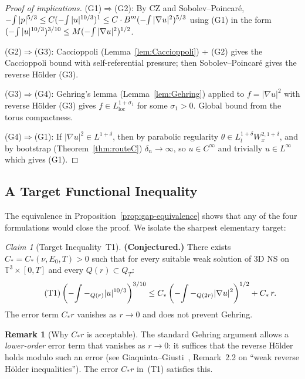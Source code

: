 \documentclass[11pt]{article}
\theoremstyle{definition}
\newtheorem{remark}[theorem]{Remark}
\theoremstyle{remark}
\newtheorem{claim}[theorem]{Claim}
\newcommand{\T}{\mathbb{T}}
\newcommand{\grad}{\nabla}
\newcommand{\Xint}{\mathop{\mathchoice{\vcenter{\hbox{$\displaystyle-$}}}%
  {\vcenter{\hbox{$\textstyle-$}}}%
  {\vcenter{\hbox{$\scriptstyle-$}}}%
  {\vcenter{\hbox{$\scriptscriptstyle-$}}}}\!\int}
\begin{document}
\begin{proof}[Proof of implications]
  (G1)$\Rightarrow$(G2): By CZ and Sobolev--Poincar\'e, $\Xint|p|^{5/3}
  \leq C(\Xint|u|^{10/3})^1\leq C\cdot B'''(\Xint|\grad u|^2)^{5/3}$
  using (G1) in the form $(\Xint|u|^{10/3})^{3/10}\leq M(\Xint|\grad u|^2)^{1/2}$.

  (G2)$\Rightarrow$(G3): Caccioppoli (Lemma~\ref{lem:Caccioppoli}) +
  (G2) gives the Caccioppoli bound with self-referential pressure;
  then Sobolev--Poincar\'e gives the reverse H\"older (G3).

  (G3)$\Rightarrow$(G4): Gehring's lemma (Lemma~\ref{lem:Gehring})
  applied to $f=|\grad u|^2$ with reverse H\"older (G3) gives
  $f\in L^{1+\sigma_1}_{\mathrm{loc}}$ for some $\sigma_1>0$.
  Global bound from the torus compactness.

  (G4)$\Rightarrow$(G1): If $|\grad u|^2\in L^{1+\delta}$, then
  by parabolic regularity $\theta\in L^{1+\delta}_tW^{2,1+\delta}_x$,
  and by bootstrap (Theorem~\ref{thm:routeC}) $\delta_n\to\infty$,
  so $u\in C^\infty$ and trivially $u\in L^\infty$ which gives (G1).
\end{proof}

\subsection{A Target Functional Inequality}

The equivalence in Proposition~\ref{prop:gap-equivalence} shows that
any of the four formulations would close the proof.  We isolate the
sharpest elementary target:

\begin{claim}[Target Inequality~T1]\label{claim:T1}
  \textbf{(Conjectured.)}
  There exists $C_*=C_*(\nu,E_0,T)>0$ such that for every suitable
  weak solution of 3D NS on $\T^3\times[0,T]$ and every
  $Q(r)\subset Q_T$:
  \begin{equation}\tag{T1}
    \left(\Xint-_{Q(r)}|u|^{10/3}\right)^{3/10}
    \leq C_*\left(\Xint-_{Q(2r)}|\grad u|^2\right)^{1/2}
      + C_*\,r.
  \end{equation}
  The error term $C_*r$ vanishes as $r\to 0$ and does not prevent Gehring.
\end{claim}

\begin{remark}[Why $C_*r$ is acceptable]
  The standard Gehring argument allows a \emph{lower-order} error term
  that vanishes as $r\to 0$: it suffices that the reverse H\"older holds
  modulo such an error (see Giaquinta--Giusti~\cite{Giaquinta1982},
  Remark~2.2 on ``weak reverse H\"older inequalities'').  The error $C_*r$
  in~(T1) satisfies this.
\end{remark}
\end{document}
